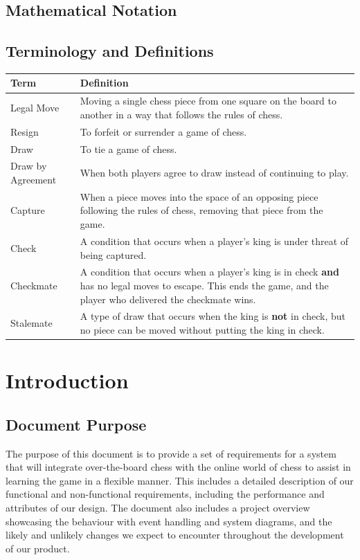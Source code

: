\documentclass[12pt]{article}
\begin{document}
\subsection{Mathematical Notation}

\subsection{Terminology and Definitions}
\begin{tabularx}{\linewidth}{ l X }
    \toprule		
    \textbf{Term} & \textbf{Definition}\\
    \midrule 
    Legal Move & Moving a single chess piece from one square on the board to another in a way that follows the rules of chess. \\[0.5cm]
    Resign & To forfeit or surrender a game of chess. \\[0.5cm]
    Draw & To tie a game of chess. \\[0.5cm]
    Draw by Agreement & When both players agree to draw instead of continuing to play. \\[0.5cm]
    Capture & When a piece moves into the space of an opposing piece following the rules of chess, removing that piece from the game. \\[0.5cm]
    Check & A condition that occurs when a player's king is under threat of being captured. \\[0.5cm]
    Checkmate & A condition that occurs when a player's king is in check \textbf{and} has no legal moves to escape. 
    This ends the game, and the player who delivered the checkmate wins. \\[0.5cm]
    Stalemate & A type of draw that occurs when the king is \textbf{not} in check, but no piece can be moved without putting the king in check. \\[0.5cm]
    \bottomrule
  \end{tabularx}

\newpage

\section{Introduction}
\subsection{Document Purpose}
The purpose of this document is to provide a set of requirements for a system that will integrate over-the-board chess with the online world of chess to assist in learning the game in a flexible manner.
This includes a detailed description of our functional and non-functional requirements, including the performance and attributes of our design. 
The document also includes a project overview showcasing the behaviour with event handling and system diagrams, and the likely and unlikely changes we expect to 
encounter throughout the development of our product.
\end{document}
